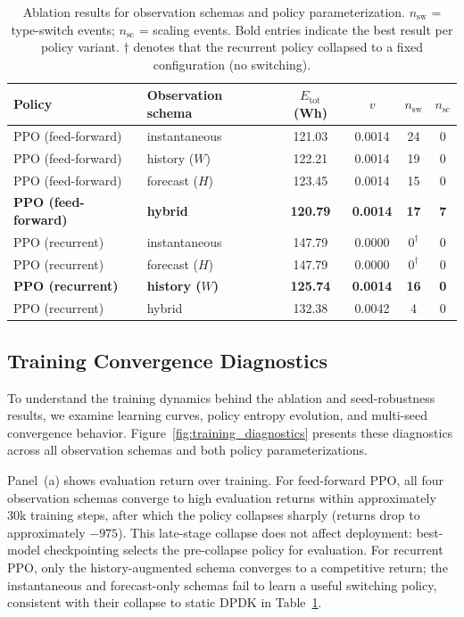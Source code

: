 \documentclass[a4paper,fleqn]{cas-sc}
\begin{document}
\begin{table}[width=.9\linewidth,cols=6,pos=h]
\centering
\caption{Ablation results for observation schemas and policy parameterization. $n_{\mathrm{sw}}$ = type-switch events; $n_{\mathrm{sc}}$ = scaling events. Bold entries indicate the best result per policy variant. $\dagger$ denotes that the recurrent policy collapsed to a fixed configuration (no switching).}
\label{tab:ablation_obs}
\begin{tabular}{l l c c c c}
\hline
Policy & Observation schema & $E_{\mathrm{tot}}$ (Wh) & $v$ & $n_{\mathrm{sw}}$ & $n_{\mathrm{sc}}$ \\
\hline
PPO (feed-forward) & instantaneous    & 121.03 & 0.0014 & 24 & 0 \\
PPO (feed-forward) & history ($W$)    & 122.21 & 0.0014 & 19 & 0 \\
PPO (feed-forward) & forecast ($H$)   & 123.45 & 0.0014 & 15 & 0 \\
\textbf{PPO (feed-forward)} & \textbf{hybrid} & \textbf{120.79} & \textbf{0.0014} & \textbf{17} & \textbf{7} \\
\hline
PPO (recurrent) & instantaneous       & 147.79 & 0.0000 & $0^\dagger$ & 0 \\
PPO (recurrent) & forecast ($H$)      & 147.79 & 0.0000 & $0^\dagger$ & 0 \\
\textbf{PPO (recurrent)} & \textbf{history ($W$)} & \textbf{125.74} & \textbf{0.0014} & \textbf{16} & \textbf{0} \\
PPO (recurrent) & hybrid              & 132.38 & 0.0042 & 4 & 0 \\
\hline
\end{tabular}
\end{table}

\subsection{Training Convergence Diagnostics}
\label{subsec:training_diagnostics}

To understand the training dynamics behind the ablation and seed-robustness results, we examine learning curves, policy entropy evolution, and multi-seed convergence behavior. Figure~\ref{fig:training_diagnostics} presents these diagnostics across all observation schemas and both policy parameterizations.

Panel~(a) shows evaluation return over training. For feed-forward PPO, all four observation schemas converge to high evaluation returns within approximately 30k training steps, after which the policy collapses sharply (returns drop to approximately $-975$). This late-stage collapse does not affect deployment: best-model checkpointing selects the pre-collapse policy for evaluation. For recurrent PPO, only the history-augmented schema converges to a competitive return; the instantaneous and forecast-only schemas fail to learn a useful switching policy, consistent with their collapse to static DPDK in Table~\ref{tab:ablation_obs}.
\end{document}
